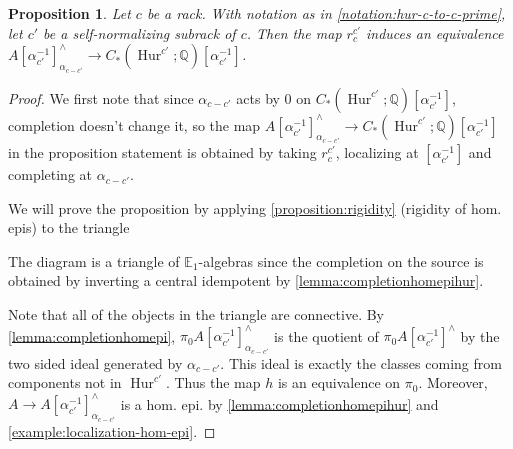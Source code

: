 \documentclass[12 pt]{amsart}
\theoremstyle{plain}
\newtheorem{proposition}[theorem]{Proposition}
\theoremstyle{definition}
\theoremstyle{remark}
\numberwithin{equation}{section}
\DeclareMathOperator\Hur{Hur}
\newcommand\QQ{\mathbb{Q}}
\newcommand\EE{\mathbb{E}}
\begin{document}
\begin{proposition}\label{proposition:propsubgp}
	Let $c$ be a rack.
	With notation as in \autoref{notation:hur-c-to-c-prime},
	let $c'$ be a self-normalizing subrack of $c$. Then the
	map $r_c^{c'}$ induces an equivalence
	$A[\alpha_{c'}^{-1}]^{\wedge}_{\alpha_{c-c'}} \to
C_*(\Hur^{c'};\QQ)[\alpha_{c'}^{-1}]$.
\end{proposition}
\begin{proof}
	We first note that since $\alpha_{c-c'}$ acts by $0$ on
	$C_*(\Hur^{c'};\QQ)[\alpha_{c'}^{-1}]$, 
	completion doesn't change it, so the map
	$A[\alpha_{c'}^{-1}]^{\wedge}_{\alpha_{c-c'}} \to
	C_*(\Hur^{c'};\QQ)[\alpha_{c'}^{-1}]$
in the proposition statement is obtained by taking $r_c^{c'}$, localizing at
$[\alpha_{c'}^{-1}]$ and completing at $\alpha_{c-c'}$.
	
	We will prove the proposition by applying \autoref{proposition:rigidity} 
	(rigidity of hom. epis)
	to the triangle
	\begin{center}
\end{center}
	The diagram is a triangle of $\EE_1$-algebras since the completion on the source is obtained by inverting a central idempotent by \autoref{lemma:completionhomepihur}.

	Note that all of the objects in the triangle are connective. By
	\autoref{lemma:completionhomepi},
	$\pi_0A[\alpha_{c'}^{-1}]^{\wedge}_{\alpha_{c-c'}}$ is the quotient of
	$\pi_0A[\alpha_{c'}^{-1}]^{\wedge}$ by the two sided
	ideal generated by $\alpha_{c-c'}$. 
	This ideal is exactly the classes coming from components not in $\Hur^{c'}$. Thus the map 
$h$
	is an equivalence on $\pi_0$.
	Moreover, $A \to A[\alpha_{c'}^{-1}]^{\wedge}_{\alpha_{c-c'}}$ is a hom. epi. by
	\autoref{lemma:completionhomepihur} and
	\autoref{example:localization-hom-epi}.


\end{proof}
\end{document}

